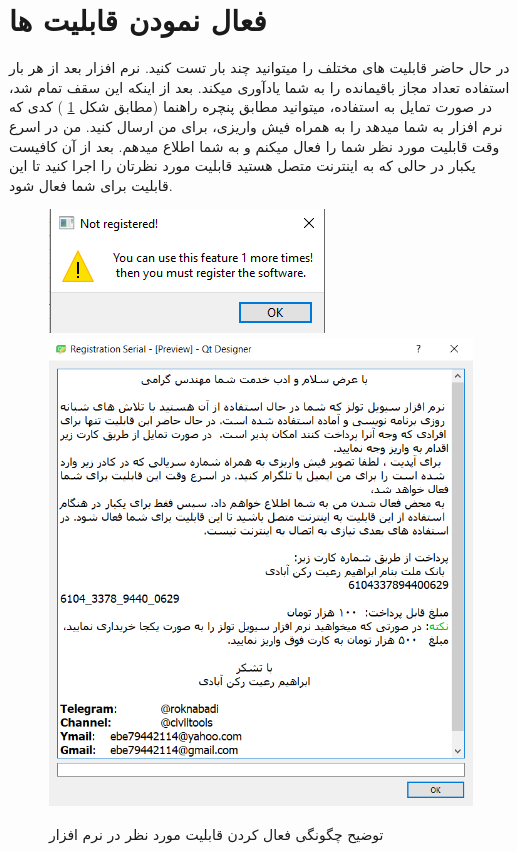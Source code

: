 \section{فعال نمودن قابلیت ها}
در حال حاضر قابلیت های مختلف را میتوانید چند بار تست کنید. نرم افزار بعد از هر بار استفاده تعداد مجاز باقیمانده را به شما یادآوری میکند. بعد از اینکه این سقف تمام شد،
در صورت تمایل به استفاده، میتوانید مطابق پنچره راهنما (مطابق شکل 
\ref{pic:register}
) کدی که نرم افزار به شما میدهد را به همراه فیش واریزی، برای من ارسال کنید. من در اسرع وقت  قابلیت مورد نظر شما را فعال میکنم و به شما اطلاع میدهم. بعد از آن کافیست یکبار در حالی که به اینترنت متصل هستید قابلیت مورد نظرتان را اجرا کنید تا این قابلیت برای شما فعال شود.

 
 \begin{figure}
     \centering
     \includegraphics[scale=0.7]{figures/no_of_using}
     \includegraphics[scale=0.8]{figures/register}
     \caption{توضیح چگونگی فعال کردن قابلیت مورد نظر در نرم افزار}
     \label{pic:register}
 \end{figure}
 
